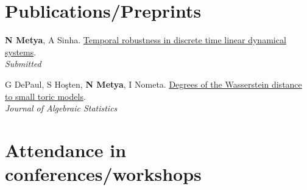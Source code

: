\section{Publications/Preprints}





\begin{etaremune}[leftmargin=13pt]
\item {\color{grey}\textbf{N Metya}, A Sinha}. \href{https://arxiv.org/abs/2505.02347}{Temporal robustness in discrete time linear dynamical systems}. \\
\textit{Submitted}\vspace{-5pt}
\item {\color{grey}G DePaul, S Ho\c{s}ten, \textbf{N Metya}, I Nometa}. \href{https://arxiv.org/abs/2402.09626}{Degrees of the Wasserstein distance to small toric models}. \\
\textit{Journal of Algebraic Statistics} 
\end{etaremune}

\vspace{-15pt}




\section{Attendance in conferences/workshops}
\resumeSubHeadingListStart

